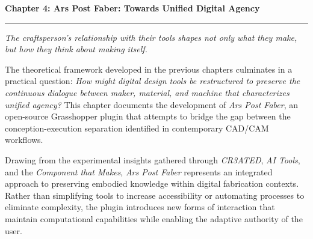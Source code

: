 \clearpage


\setcounter{chapter}{4}
\setcounter{section}{0}


\pagestyle{fancy}
\fancyhf{} %
\fancyfoot[C]{\thepage} %
\renewcommand{\headrulewidth}{0pt}
\renewcommand{\footrulewidth}{0pt}

\noindent
{\Large\textbf{Chapter 4: Ars Post Faber: Towards Unified Digital Agency}}
\vspace{0.3cm}
\hrule
\vspace{0.8cm}
\label{ch:ArsPostFaber}

\setlength{\parindent}{0pt}

\textit{The craftsperson's relationship with their tools shapes not only what they make, but how they think about making itself.}

\vspace{0.5cm}

The theoretical framework developed in the previous chapters culminates in a practical question: \textit{How might digital design tools be restructured to preserve the continuous dialogue between maker, material, and machine that characterizes unified agency?} This chapter documents the development of \textit{Ars Post Faber}, an open-source Grasshopper plugin that attempts to bridge the gap between the conception-execution separation identified in contemporary CAD/CAM workflows.

\vspace{0.5cm}

Drawing from the experimental insights gathered through \textit{CR3ATED}, \textit{AI Tools}, and the \textit{Component that Makes}, \textit{Ars Post Faber} represents an integrated approach to preserving embodied knowledge within digital fabrication contexts. Rather than simplifying tools to increase accessibility or automating processes to eliminate complexity, the plugin introduces new forms of interaction that maintain computational capabilities while enabling the adaptive authority of the user.

